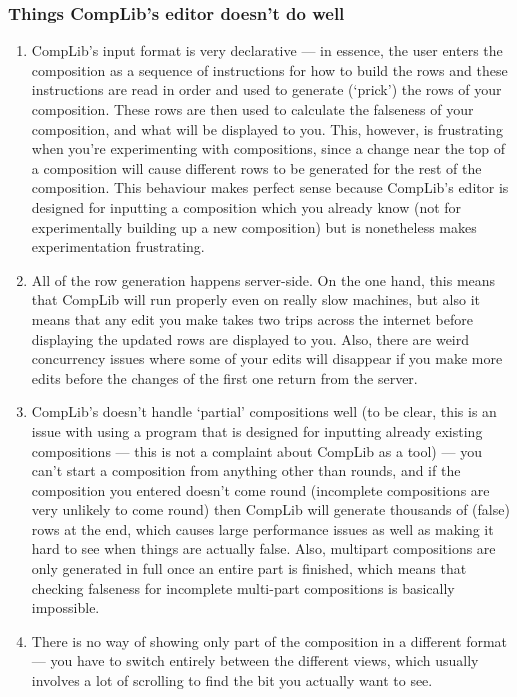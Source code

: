 \documentclass[12pt]{article}
\begin{document}
\subsubsection{Things CompLib's editor doesn't do well}

\begin{enumerate}
    \item CompLib's input format is very declarative --- in essence, the user enters the composition
        as a sequence of instructions for how to build the rows and these instructions are read
        in order and used to generate (`prick') the rows of your composition.  These rows are then
        used to calculate the falseness of your composition, and what will be displayed to you.
        This, however, is frustrating when you're experimenting with compositions, since a change
        near the top of a composition will cause different rows to be generated for the rest of the
        composition.  This behaviour makes perfect sense because CompLib's editor is designed for
        inputting a composition which you already know (not for experimentally building up a new
        composition) but is nonetheless makes experimentation frustrating.
    \item All of the row generation happens server-side.  On the one hand, this means that CompLib
        will run properly even on really slow machines, but also it means that any edit you make
        takes two trips across the internet before displaying the updated rows are displayed to you.
        Also, there are weird concurrency issues where some of your edits will disappear if you make
        more edits before the changes of the first one return from the server.
    \item CompLib's doesn't handle `partial' compositions well (to be clear, this is an issue
        with using a program that is designed for inputting already existing compositions ---
        this is not a complaint about CompLib as a tool) --- you can't start a composition from
        anything other than rounds, and if the composition you entered doesn't come round
        (incomplete compositions are very unlikely to come round) then CompLib will generate
        thousands of (false) rows at the end, which causes large performance issues as well as
        making it hard to see when things are actually false.  Also, multipart compositions are only
        generated in full once an entire part is finished, which means that checking falseness for
        incomplete multi-part compositions is basically impossible.
    \item There is no way of showing only part of the composition in a different format --- you have
        to switch entirely between the different views, which usually involves a lot of scrolling to
        find the bit you actually want to see.
\end{enumerate}
\end{document}

